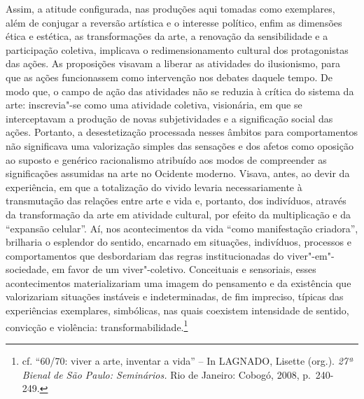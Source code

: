Assim, a atitude configurada, nas produções aqui tomadas como
exemplares, além de conjugar a reversão artística e o interesse
político, enfim as dimensões ética e estética, as transformações da
arte, a renovação da sensibilidade e a participação coletiva, implicava
o redimensionamento cultural dos protagonistas das ações. As proposições
visavam a liberar as atividades do ilusionismo, para que as ações
funcionassem como intervenção nos debates daquele tempo. De modo que, o
campo de ação das atividades não se reduzia à crítica do sistema da
arte: inscrevia"-se como uma atividade coletiva, visionária, em que se
interceptavam a produção de novas subjetividades e a significação social
das ações. Portanto, a desestetização processada nesses âmbitos para
comportamentos não significava uma valorização simples das sensações e
dos afetos como oposição ao suposto e genérico racionalismo atribuído
aos modos de compreender as significações assumidas na arte no Ocidente
moderno. Visava, antes, ao devir da experiência, em que a totalização do
vivido levaria necessariamente à transmutação das relações entre arte e
vida e, portanto, dos indivíduos, através da transformação da arte em
atividade cultural, por efeito da multiplicação e da ``expansão
celular''. Aí, nos acontecimentos da vida ``como manifestação
criadora'', brilharia o esplendor do sentido, encarnado em situações,
indivíduos, processos e comportamentos que desbordariam das regras
institucionadas do viver"-em"-sociedade, em favor de um viver"-coletivo.
Conceituais e sensoriais, esses acontecimentos materializariam uma
imagem do pensamento e da existência que valorizariam situações
instáveis e indeterminadas, de fim impreciso, típicas das experiências
exemplares, simbólicas, nas quais coexistem intensidade de sentido,
convicção e violência: transformabilidade.\footnote{cf. ``60/70: viver a
  arte, inventar a vida'' -- In \textsc{LAGNADO}, Lisette (org.). \emph{27ª
  Bienal de São Paulo: Seminários.} Rio de Janeiro: Cobogó, 2008, p.~240-249.}

\pagebreak

\setcounter{footnote}{0}
\begin{vplace}[0.25]
\thispagestyle{empty}
{\large{}}
\end{vplace}

\pagebreak
\thispagestyle{empty}

